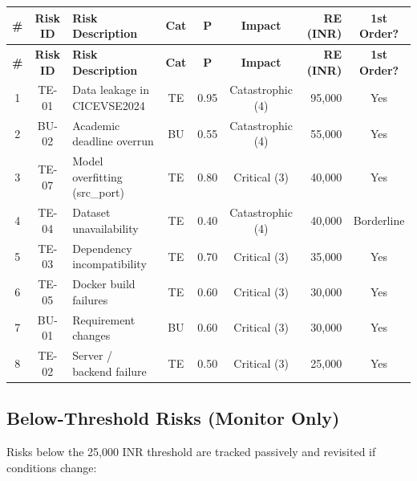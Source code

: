 \documentclass[11pt, a4paper]{article}
\newcommand{\cmark}{\textcolor{accent}{\ding{51}}}
\newcommand{\wmark}{\textcolor{warning}{\ding{115}}}
\begin{document}
\small
\begin{longtable}{|c|c|p{3.8cm}|c|c|c|r|c|}
\hline
\rowcolor{danger!15}
\textbf{\#} & \textbf{Risk ID} & \textbf{Risk Description} & \textbf{Cat} & \textbf{P} & \textbf{Impact} & \textbf{RE (INR)} & \textbf{1st Order?} \\
\hline
\endfirsthead
\hline
\rowcolor{danger!15}
\textbf{\#} & \textbf{Risk ID} & \textbf{Risk Description} & \textbf{Cat} & \textbf{P} & \textbf{Impact} & \textbf{RE (INR)} & \textbf{1st Order?} \\
\hline
\endhead

\rowcolor{red!8}
1 & TE-01 & Data leakage in CICEVSE2024 & TE & 0.95 & Catastrophic (4) & 95,000 & \cmark{} Yes \\
\hline
\rowcolor{red!6}
2 & BU-02 & Academic deadline overrun & BU & 0.55 & Catastrophic (4) & 55,000 & \cmark{} Yes \\
\hline
\rowcolor{orange!8}
3 & TE-07 & Model overfitting (src\_port) & TE & 0.80 & Critical (3) & 40,000 & \cmark{} Yes \\
\hline
\rowcolor{orange!6}
4 & TE-04 & Dataset unavailability & TE & 0.40 & Catastrophic (4) & 40,000 & \wmark{} Borderline \\
\hline
\rowcolor{orange!6}
5 & TE-03 & Dependency incompatibility & TE & 0.70 & Critical (3) & 35,000 & \cmark{} Yes \\
\hline
\rowcolor{yellow!10}
6 & TE-05 & Docker build failures & TE & 0.60 & Critical (3) & 30,000 & \cmark{} Yes \\
\hline
\rowcolor{yellow!10}
7 & BU-01 & Requirement changes & BU & 0.60 & Critical (3) & 30,000 & \cmark{} Yes \\
\hline
\rowcolor{yellow!8}
8 & TE-02 & Server / backend failure & TE & 0.50 & Critical (3) & 25,000 & \cmark{} Yes \\
\hline
\end{longtable}
\normalsize

\subsection{Below-Threshold Risks (Monitor Only)}

Risks below the 25,000 INR threshold are tracked passively and revisited if conditions change:
\end{document}

